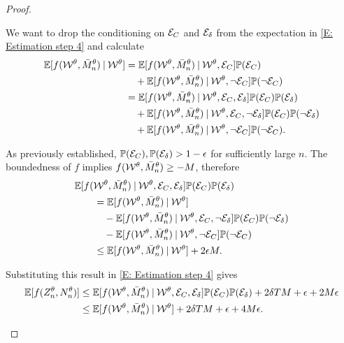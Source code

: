 \begin{proof}
\begin{proofpart}
We want to drop the conditioning on $\Event{C}$ and $\Event{\delta}$ from the expectation in \eqref{E: Estimation step 4}
and calculate
\begin{equation*}
\begin{aligned}
	\Exp{f(\WtX, \rNdis) \cond \WtX } 
	&= \Exp{f(\WtX, \rNdis) \cond \WtX, \Event{C}} \Prob(\Event{C}) \\
	&\quad + \Exp{f(\WtX, \rNdis) \cond \WtX, \neg \Event{C}} \Prob(\neg\Event{C}) \\
	&= \Exp{f(\WtX, \rNdis) \cond \WtX, \Event{C}, \Event{\delta} } \Prob(\Event{C}) \Prob(\Event{\delta}) \\
	&\quad + \Exp{f(\WtX, \rNdis) \cond \WtX, \Event{C}, \neg \Event{\delta}} \Prob(\Event{C}) \Prob(\neg \Event{\delta})\\
	&\quad + \Exp{f(\WtX, \rNdis) \cond \WtX, \neg \Event{C}} \Prob(\neg\Event{C}).
\end{aligned}
\end{equation*}

As previously established, $\Prob(\Event{C}), \Prob(\Event{\delta}) > 1 - \epsilon$ for sufficiently large $n$.
The boundedness of $f$ implies $f(\WtX, \rNdis) \geq -M$, therefore
\begin{equation*}
\begin{aligned}
	&\Exp{f(\WtX, \rNdis) \cond \WtX, \Event{C}, \Event{\delta} } \Prob(\Event{C}) \Prob(\Event{\delta}) \\
	&\qquad = \Exp{f(\WtX, \rNdis) \cond \WtX } \\
	&\qquad\quad - \Exp{f(\WtX, \rNdis) \cond \WtX, \Event{C}, \neg \Event{\delta}} \Prob(\Event{C}) \Prob(\neg \Event{\delta}) \\
	&\qquad\quad - \Exp{f(\WtX, \rNdis) \cond \WtX, \neg \Event{C}} \Prob(\neg\Event{C}) \\
	&\qquad \leq \Exp{f(\WtX, \rNdis) \cond \WtX } + 2\epsilon M.
\end{aligned}
\end{equation*}

Substituting this result in \eqref{E: Estimation step 4} gives
\begin{equation} \label{E: Estimation step 5}
\begin{aligned}
	\Exp{f(\znt, \nnt)} 
	&\leq \Exp{f(\WtX, \rNdis) \cond \WtX, \Event{C}, \Event{\delta}}\Prob(\Event{C})\Prob(\Event{\delta}) + 2\delta T M + \epsilon  + 2M\epsilon  \\
	&\leq \Exp{f(\WtX, \rNdis) \cond \WtX } + 2\delta T M + \epsilon  + 4M\epsilon.
\end{aligned}
\end{equation}


\end{proofpart}
\end{proof}
